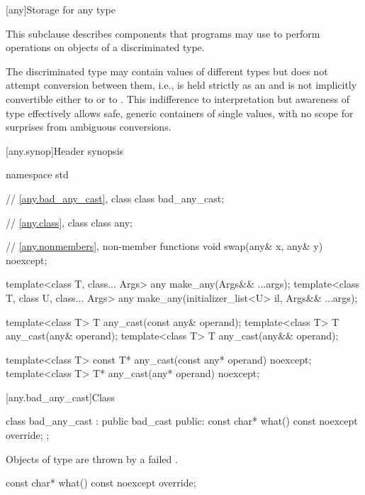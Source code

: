 [any]{Storage for any type}

\pnum
This subclause describes components that \Cpp{} programs may use to perform operations on objects of a discriminated type.

\pnum
\begin{note}
The discriminated type may contain values of different types but does not attempt conversion between them,
i.e.,  is held strictly as an  and is not implicitly convertible either to  or to .
This indifference to interpretation but awareness of type effectively allows safe, generic containers of single values, with no scope for surprises from ambiguous conversions.
\end{note}

[any.synop]{Header  synopsis}

%

\begin{codeblock}
namespace std {
  // \ref{any.bad_any_cast}, class 
  class bad_any_cast;

  // \ref{any.class}, class 
  class any;

  // \ref{any.nonmembers}, non-member functions
  void swap(any& x, any& y) noexcept;

  template<class T, class... Args>
    any make_any(Args&& ...args);
  template<class T, class U, class... Args>
    any make_any(initializer_list<U> il, Args&& ...args);

  template<class T>
    T any_cast(const any& operand);
  template<class T>
    T any_cast(any& operand);
  template<class T>
    T any_cast(any&& operand);

  template<class T>
    const T* any_cast(const any* operand) noexcept;
  template<class T>
    T* any_cast(any* operand) noexcept;
}
\end{codeblock}

[any.bad_any_cast]{Class }

%
\begin{codeblock}
class bad_any_cast : public bad_cast {
public:
  const char* what() const noexcept override;
};
\end{codeblock}

\pnum
Objects of type  are thrown by a failed .

%
\begin{itemdecl}
const char* what() const noexcept override;
\end{itemdecl}

